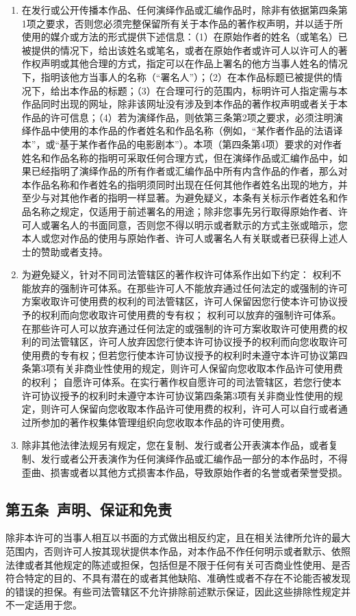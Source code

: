 \begin{enumerate}
	\item 在发行或公开传播本作品、任何演绎作品或汇编作品时，除非有依据第四条第1项之要求，否则您必须完整保留所有关于本作品的著作权声明，并以适于所使用的媒介或方法的形式提供下述信息：（1）在原始作者的姓名（或笔名）已被提供的情况下，给出该姓名或笔名，或者在原始作者或许可人以许可人的著作权声明或其他合理的方式，指定可以在作品上署名的他方当事人姓名的情况下，指明该他方当事人的名称（“署名人”）；（2）在本作品标题已被提供的情况下，给出本作品的标题；（3）在合理可行的范围内，标明许可人指定需与本作品同时出现的网址，除非该网址没有涉及到本作品的著作权声明或者关于本作品的许可信息；（4）若为演绎作品，则依第三条第2项之要求，必须注明演绎作品中使用的本作品的作者姓名和作品名称（例如，“某作者作品的法语译本”，或“基于某作者作品的电影剧本”）。本项（第四条第4项）要求的对作者姓名和作品名称的指明可采取任何合理方式，但在演绎作品或汇编作品中，如果已经指明了演绎作品的所有作者或汇编作品中所有内含作品的作者，那么对本作品名称和作者姓名的指明须同时出现在任何其他作者姓名出现的地方，并至少与对其他作者的指明一样显著。为避免疑义，本条有关标示作者姓名和作品名称之规定，仅适用于前述署名的用途；除非您事先另行取得原始作者、许可人或署名人的书面同意，否则您不得以明示或者默示的方式主张或暗示，您本人或您对作品的使用与原始作者、许可人或署名人有关联或者已获得上述人士的赞助或者支持。
	\item 为避免疑义，针对不同司法管辖区的著作权许可体系作出如下约定：
	\subitem 权利不能放弃的强制许可体系。在那些许可人不能放弃通过任何法定的或强制的许可方案收取许可使用费的权利的司法管辖区，许可人保留因您行使本许可协议授予的权利而向您收取许可使用费的专有权；
	\subitem 权利可以放弃的强制许可体系。在那些许可人可以放弃通过任何法定的或强制的许可方案收取许可使用费的权利的司法管辖区，许可人放弃因您行使本许可协议授予的权利而向您收取许可使用费的专有权；但若您行使本许可协议授予的权利时未遵守本许可协议第四条第3项有关非商业性使用的规定，则许可人保留向您收取本作品许可使用费的权利；
	\subitem 自愿许可体系。在实行著作权自愿许可的司法管辖区，若您行使本许可协议授予的权利时未遵守本许可协议第四条第3项有关非商业性使用的规定，则许可人保留向您收取本作品许可使用费的权利，许可人可以自行或者通过所参加的著作权集体管理组织向您收取本作品的许可使用费。
	\item 除非其他法律法规另有规定，您在复制、发行或者公开表演本作品，或者复制、发行或者公开表演作为任何演绎作品或汇编作品一部分的本作品时，不得歪曲、损害或者以其他方式损害本作品，导致原始作者的名誉或者荣誉受损。
\end{enumerate}
\subsection{第五条\ 声明、保证和免责}
除非本许可的当事人相互以书面的方式做出相反约定，且在相关法律所允许的最大范围内，否则许可人按其现状提供本作品，对本作品不作任何明示或者默示、依照法律或者其他规定的陈述或担保，包括但是不限于任何有关可否商业性使用、是否符合特定的目的、不具有潜在的或者其他缺陷、准确性或者不存在不论能否被发现的错误的担保。有些司法管辖区不允许排除前述默示保证，因此这些排除性规定并不一定适用于您。
